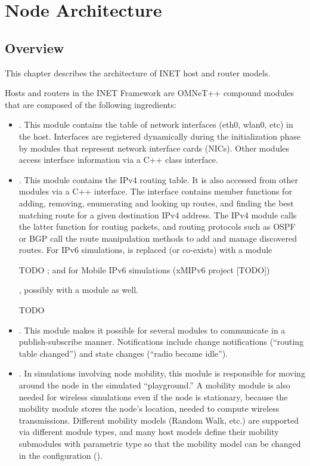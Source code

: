 \chapter{Node Architecture}
\label{cha:node-architecture}


\section{Overview}

This chapter describes the architecture of INET host and router models.

Hosts and routers in the INET Framework are OMNeT++ compound modules that
are composed of the following ingredients:

\begin{itemize}

\item {}. This module
contains the table of network interfaces (eth0, wlan0, etc) in the host.
Interfaces are registered dynamically during the initialization phase by
modules that represent network interface cards (NICs). Other modules access
interface information via a C++ class interface.

\item {}. This module contains
the IPv4 routing table. It is also accessed from other modules via a C++ interface.
The interface contains member functions for adding, removing, enumerating
and looking up routes, and finding the best matching route for a given
destination IPv4 address. The IPv4 module calls the latter function for
routing packets, and routing protocols such as OSPF or BGP call the route
manipulation methods to add and manage discovered routes. For IPv6
simulations,  is replaced (or co-exists) with
a  module

\ifdraft TODO
; and for Mobile IPv6 simulations (xMIPv6 project [TODO])
\fi

, possibly with a  module
as well.

\ifdraft TODO
\item {}. This module
makes it possible for several modules to communicate in a publish-subscribe
manner. Notifications include change notifications (``routing table
changed'') and state changes (``radio became idle'').
\fi

\item {}. In simulations involving node mobility, this
module is responsible for moving around the node in the simulated
``playground.'' A mobility module is also needed for wireless simulations
even if the node is stationary, because the mobility module stores the
node's location, needed to compute wireless transmissions. Different
mobility models (Random Walk, etc.) are supported via different module
types, and many host models define their mobility submodules with
parametric type so that the mobility model can be changed in the
configuration ().


\end{itemize}
